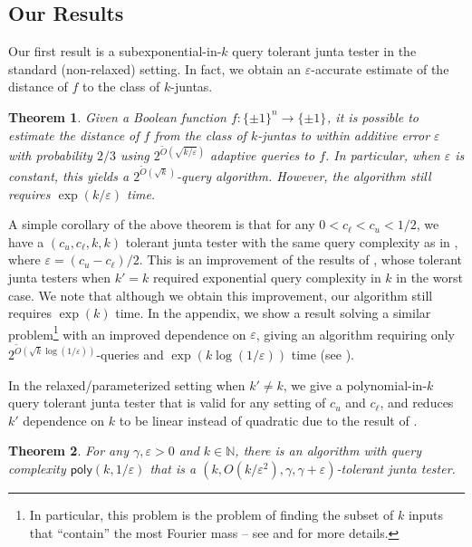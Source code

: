 \documentclass[10pt,a4paper]{article}
\providecommand{\poly}{\mathsf{poly}}
\theoremstyle{plain}
\newtheorem{theorem}{Theorem}[section]
\theoremstyle{remark}
\theoremstyle{plain}
\newcommand{\N}{\mathbb{N}}
\newcommand{\eps}{\varepsilon}
\renewcommand{\tilde}{\widetilde}
\newcommand{\BooleanHypercube}[1]{\{\pm 1\}^{#1}}
\renewcommand{\epsilon}{\varepsilon}
\begin{document}
\subsection{Our Results}

Our first result is a subexponential-in-$k$ query tolerant junta tester in the standard (non-relaxed) setting. In fact, we obtain an $\eps$-accurate estimate of the distance of $f$ to the class of $k$-juntas. 


\begin{theorem}
\label{theorem:main-result}
Given a Boolean function $f: \BooleanHypercube{n} \to \BooleanHypercube{}$, it is possible to estimate the distance of $f$ from the class of $k$-juntas to within additive error $\epsilon$ with probability $2/3$ using 
$ 2^{\tilde{O}(\sqrt{k/\varepsilon})}$ adaptive queries to $f$. In particular, when $\epsilon$ is constant, this yields a $2^{\tilde{O}(\sqrt{k})}$-query algorithm. However, the algorithm still requires $\exp(k/\eps)$ time.
\end{theorem}


A simple corollary of the above theorem is that for any $0 < c_\ell < c_u < 1/2$, we have a $(c_u, c_\ell, k,k)$ tolerant junta tester with the same query complexity as in , where $\epsilon = (c_u - c_\ell)/2$. This is an improvement of the results of \cite{junta-coordinate-oracles, junta-submodular-opt}, whose tolerant junta testers when $k'=k$ required exponential query complexity in $k$ in the worst case. We note that although we obtain this improvement, our algorithm still requires $\exp(k)$ time. 
%
In the appendix, we show a result solving a similar problem\footnote{In particular, this problem is the problem of finding the subset of $k$ inputs that ``contain'' the most Fourier mass -- see  and  for more details.} with an improved dependence on $\eps$, giving an algorithm requiring only $2^{\tilde{O}(\sqrt{k}\log(1/\eps))}$-queries and $\exp(k\log(1/\eps))$ time (see ).

In the relaxed/parameterized setting when $k' \neq k$, we give a polynomial-in-$k$ query tolerant junta tester that is valid for any setting of $c_u$ and $c_\ell$, and reduces $k'$ dependence on $k$ to be linear instead of quadratic due to the result of \cite[Corollary 1.6]{junta-coordinate-oracles}.


\begin{theorem}
\label{theorem:improved-dmn-intro}
For any $\gamma,\eps>0$ and $k \in \N$, there is an algorithm with query complexity $\poly(k, 1 / \eps)$ that is a $(k , O(k/\eps^2), \gamma, \gamma+\eps)$-tolerant junta tester.
\end{theorem}
\end{document}
